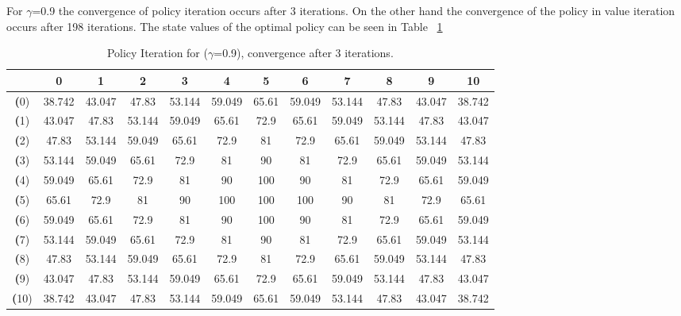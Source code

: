 \documentclass[11pt]{article}
\begin{document}
For $\gamma$=0.9 the convergence of policy iteration occurs after 3 iterations. On the other hand the convergence of the policy in value iteration occurs after 198 iterations. The state values of the optimal policy can be seen in Table ~\ref{gamma=0.9}

\begin{center}
\begin{table}[ht]
{\small
\hfill{}
\begin{tabular}{c|c|c|c|c|c|c|c|c|c|c|c}
\textbf{} & \textbf{0} & \textbf{1} & \textbf{2} & \textbf{3} & \textbf{4} & \textbf{5} & \textbf{6} & \textbf{7} & \textbf{8} & \textbf{9} & \textbf{10}\\
	\hline

\textbf(0)& 38.742	& 43.047	& 47.83	& 53.144	& 59.049	& 65.61	& 59.049	& 53.144	& 47.83	& 43.047	& 38.742	\\
\textbf(1)& 43.047	& 47.83	& 53.144	& 59.049	& 65.61	& 72.9	& 65.61	& 59.049	& 53.144	& 47.83	& 43.047	\\
\textbf(2)& 47.83	& 53.144	& 59.049	& 65.61	& 72.9	& 81	& 72.9	& 65.61	& 59.049	& 53.144	& 47.83	\\
\textbf(3)& 53.144	& 59.049	& 65.61	& 72.9	& 81	& 90	& 81	& 72.9	& 65.61	& 59.049	& 53.144	\\
\textbf(4)& 59.049	& 65.61	& 72.9	& 81	& 90	& 100	& 90	& 81	& 72.9	& 65.61	& 59.049	\\
\textbf(5)& 65.61	& 72.9	& 81	& 90	& 100	& 100	& 100	& 90	& 81	& 72.9	& 65.61	\\
\textbf(6)& 59.049	& 65.61	& 72.9	& 81	& 90	& 100	& 90	& 81	& 72.9	& 65.61	& 59.049	\\
\textbf(7)& 53.144	& 59.049	& 65.61	& 72.9	& 81	& 90	& 81	& 72.9	& 65.61	& 59.049	& 53.144	\\
\textbf(8)& 47.83	& 53.144	& 59.049	& 65.61	& 72.9	& 81	& 72.9	& 65.61	& 59.049	& 53.144	& 47.83	\\
\textbf(9)& 43.047	& 47.83	& 53.144	& 59.049	& 65.61	& 72.9	& 65.61	& 59.049	& 53.144	& 47.83	& 43.047	\\
\textbf(10)& 38.742	& 43.047	& 47.83	& 53.144	& 59.049	& 65.61	& 59.049	& 53.144	& 47.83	& 43.047	& 38.742	\\

\end{tabular}}
\hfill{}
\caption{Policy Iteration for ($\gamma$=0.9), convergence after 3 iterations.}
\label{gamma=0.9}
\end{table}
\end{center}
\end{document}
